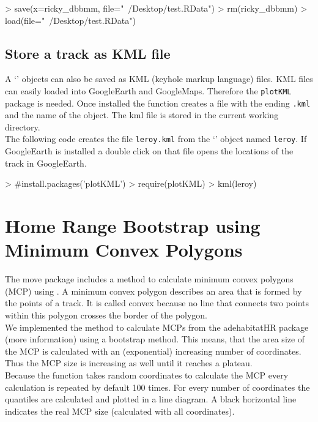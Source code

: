 \documentclass[article,nojss]{jss}
\newcommand{\fct}[1]{{\code{#1()}}}
\newcommand{\class}[1]{{`\code{#1}'}}
\begin{document}
\begin{Schunk}
\begin{Sinput}
> save(x=ricky_dbbmm, file="~/Desktop/test.RData")
> rm(ricky_dbbmm)
> load(file="~/Desktop/test.RData")
\end{Sinput}
\end{Schunk}


\subsection{Store a track as KML file}
A \class{Move} objects can also be saved as KML (keyhole markup language) files. KML files can easily loaded into GoogleEarth and GoogleMaps. Therefore the \texttt{plotKML} package is needed. Once installed the \fct{kml} function creates a file with the ending \texttt{.kml} and the name of the object. The kml file is stored in the current working directory. \\
The following code creates the file \texttt{leroy.kml} from the \class{Move} object named \texttt{leroy}. If GoogleEarth is installed a double click on that file opens the locations of the track in GoogleEarth.

\begin{Schunk}
\begin{Sinput}
> #install.packages('plotKML')
> require(plotKML)
> kml(leroy)
\end{Sinput}
\end{Schunk}



\section{Home Range Bootstrap using Minimum Convex Polygons}
The move package includes a method to calculate minimum convex polygons (MCP) using \fct{hrBootstrap}. A minimum convex polygon describes an area that is formed by the points of a track. It is called convex because no line that connects two points within this polygon crosses the border of the polygon. \\
We implemented the method to calculate MCPs from the adehabitatHR package (more information) using a bootstrap method. This means, that the area size of the MCP is calculated with an (exponential) increasing number of coordinates. Thus the MCP size is increasing as well until it reaches a plateau. \\
Because the function takes random coordinates to calculate the MCP every calculation is repeated by default 100 times. For every number of coordinates the quantiles are calculated and plotted in a line diagram. A black horizontal line indicates the real MCP size (calculated with all coordinates).
\end{document}
